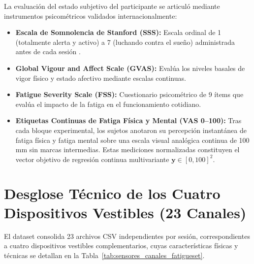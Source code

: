 La evaluación del estado subjetivo del participante se articuló mediante instrumentos psicométricos validados internacionalmente:
\begin{itemize}
    \item \textbf{Escala de Somnolencia de Stanford (SSS):} Escala ordinal de 1 (totalmente alerta y activo) a 7 (luchando contra el sueño) administrada antes de cada sesión \cite{hoddes1973quantification}.
    \item \textbf{Global Vigour and Affect Scale (GVAS):} Evalúa los niveles basales de vigor físico y estado afectivo mediante escalas continuas.
    \item \textbf{Fatigue Severity Scale (FSS):} Cuestionario psicométrico de 9 ítems que evalúa el impacto de la fatiga en el funcionamiento cotidiano.
    \item \textbf{Etiquetas Continuas de Fatiga Física y Mental (VAS 0--100):} Tras cada bloque experimental, los sujetos anotaron su percepción instantánea de fatiga física y fatiga mental sobre una escala visual analógica continua de 100 mm sin marcas intermedias. Estas mediciones normalizadas constituyen el vector objetivo de regresión continua multivariante $\bm{y} \in [0, 100]^2$.
\end{itemize}



\section{Desglose Técnico de los Cuatro Dispositivos Vestibles (23 Canales)}
\label{sec:sensores_tecnicos}

El dataset consolida 23 archivos CSV independientes por sesión, correspondientes a cuatro dispositivos vestibles complementarios, cuyas características físicas y técnicas se detallan en la Tabla~\ref{tab:sensores_canales_fatigueset}.

